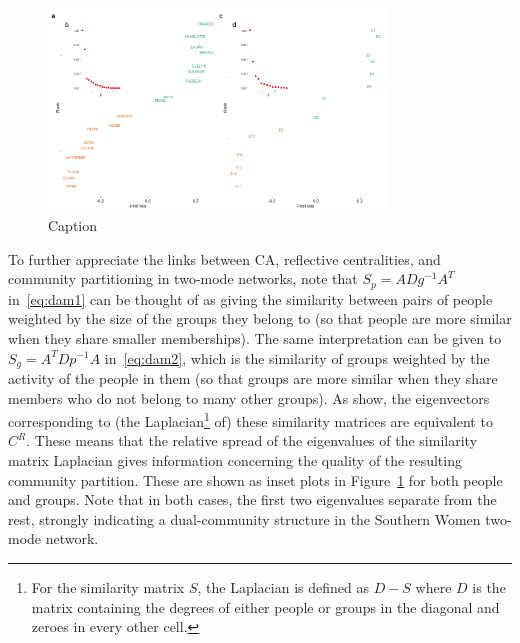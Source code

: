 \documentclass[a4paper,fleqn]{cas-sc}
\begin{document}
\begin{figure}
    \centering
    \includegraphics[width=0.8\textwidth]{Plots/eigvec.png}
    \caption{Caption}
    \label{fig:eigvec}
\end{figure}

To further appreciate the links between CA, reflective centralities, and community partitioning in two-mode networks, note that $S_p = ADg^{-1}A^T$ in~\ref{eq:dam1} can be thought of as giving the similarity between pairs of people weighted by the size of the groups they belong to (so that people are more similar when they share smaller memberships). The same interpretation can be given to $S_g = A^TDp^{-1}A$ in~\ref{eq:dam2}, which is the similarity of groups weighted by the activity of the people in them (so that groups are more similar when they share members who do not belong to many other groups). As \citet{van2021correspondence} show, the eigenvectors corresponding to (the Laplacian\footnote{For the similarity matrix $S$, the Laplacian is defined as $D-S$ where $D$ is the matrix containing the degrees of either people or groups in the diagonal and zeroes in every other cell.} of) these similarity matrices are equivalent to $C^R$. These means that the relative spread of the eigenvalues of the similarity matrix Laplacian gives information concerning the quality of the resulting community partition. These are shown as inset plots in Figure~\ref{fig:eigvec} for both people and groups. Note that in both cases, the first two eigenvalues separate from the rest, strongly indicating a dual-community structure in the Southern Women two-mode network. 
\end{document}
